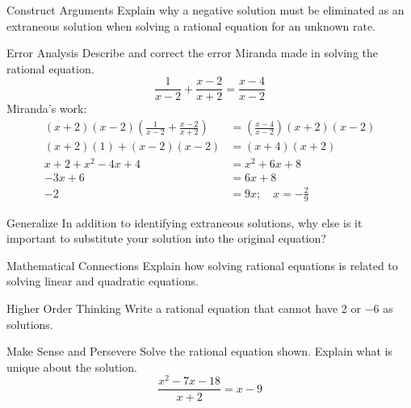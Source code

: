 \documentclass{article}
\newenvironment{practice}[2]{}{}        %
\newcommand{\answer}[1]{}               %
\begin{document}
\begin{practice}{9}{2}
Construct Arguments Explain why a negative solution must be eliminated as an extraneous solution when solving a rational equation for an unknown rate.
\answer{The rate must be positive.}
\end{practice}

\begin{practice}{10}{2}
Error Analysis Describe and correct the error Miranda made in solving the rational equation.
\[
\frac{1}{x-2}+\frac{x-2}{x+2}=\frac{x-4}{x-2}
\]
Miranda's work:
\begin{align*}
(x+2)(x-2)\left(\frac{1}{x-2}+\frac{x-2}{x+2}\right)&=\left(\frac{x-4}{x-2}\right)(x+2)(x-2)\\
(x+2)(1)+(x-2)(x-2)&=(x+4)(x+2)\\
x+2+x^2-4x+4&=x^2+6x+8\\
-3x+6&=6x+8\\
-2&=9x;\quad x=-\frac{2}{9}
\end{align*}
\answer{In the third step of her work, she incorrectly uses $x+4$ rather than $x-4$ on the right-hand side of the equation. This throws every step thereafter; therefore, the solution is incorrect.}
\end{practice}

\begin{practice}{11}{2}
Generalize In addition to identifying extraneous solutions, why else is it important to substitute your solution into the original equation?
\answer{Verify that students' answers are correct.}
\end{practice}

\begin{practice}{12}{2}
Mathematical Connections Explain how solving rational equations is related to solving linear and quadratic equations.
\answer{Oftentimes the steps involved in solving a rational equation transform it into a linear or quadratic equation.}
\end{practice}

\begin{practice}{13}{3}
Higher Order Thinking Write a rational equation that cannot have 2 or $-6$ as solutions.
\answer{Sample: $\frac{1}{x-2}+\frac{2}{x+6}=10$}
\end{practice}

\begin{practice}{14}{2}
Make Sense and Persevere Solve the rational equation shown. Explain what is unique about the solution.
\[
\frac{x^2-7x-18}{x+2}=x-9
\]
\answer{Sample: The equation reduces to an identity; the solution is the set of all real numbers except $-2$.}
\end{practice}
\end{document}

